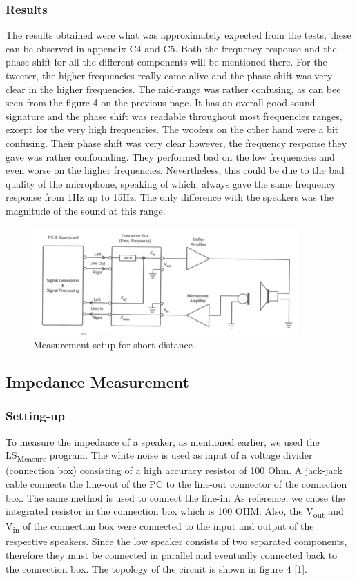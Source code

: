 \documentclass{article}
\begin{document}
\subsubsection{Results}
The results obtained were what was approximately expected from the tests, these can be observed in appendix C4 and C5. Both the frequency response and the phase shift for all the different components will be mentioned there. For the tweeter, the higher frequencies really came alive and the phase shift was very clear in the higher frequencies. The mid-range was rather confusing, as can bee seen from the figure 4 on the previous page. It has an overall good sound signature and the phase shift was readable throughout most frequencies ranges, except for the very high frequencies. The woofers on the other hand were a bit confusing. Their phase shift was very clear however, the frequency response they gave was rather confounding. They performed bad on the low frequencies and even worse on the higher frequencies. Nevertheless, this could be due to the bad quality of the microphone, speaking of which, always gave the same frequency response from 1Hz up to 15Hz. The only difference with the speakers was the magnitude of the sound at this range.

\begin{figure}
 \centering
  \includegraphics[width=0.9\textwidth]{Figures/Setup}
  \caption{Measurement setup for short distance }
  \label{fig:shortdistancemeasurement}
\end{figure}


\newpage
\subsection{Impedance Measurement}
\subsubsection{Setting-up}
To measure the impedance of a speaker, as mentioned earlier, we used the LS\textsubscript{Measure} program. The white noise is used as input of a voltage divider (connection box) consisting of a high accuracy resistor of 100 Ohm. A jack-jack cable connects the line-out of the PC to the line-out connector of the connection box. The same method is used to connect the line-in. 
\newline
As reference, we chose the integrated resistor in the connection box which is 100 OHM. Also, the V\textsubscript{out} and V\textsubscript{in} of the connection box were connected to the input and output of the respective speakers. Since the low speaker consists of two separated components, therefore they must be connected in parallel and eventually connected back to the connection box. The topology of the circuit is shown in figure 4 [1].       
\end{document}
